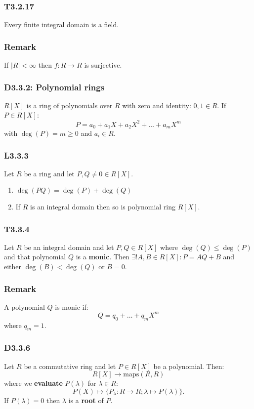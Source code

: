\documentclass{article}
\begin{document}
\begin{multicols*}{3}
\subsubsection*{T3.2.17}
Every finite integral domain is a field.

\subsubsection*{Remark}
If $|R|<\infty$ then $f:R\rightarrow R$ is surjective.

\subsubsection*{D3.3.2: Polynomial rings}
$R[X]$ is a ring of polynomials over $R$ 
with zero and identity: $0,1\in R$. If $P\in R[X]$:
$$P=a_0+a_1 X+a_2 X^2+\dots+a_m X^m$$
with $\deg(P)=m\geq0$ and $a_i\in R$.

\subsubsection*{L3.3.3}
Let $R$ be a ring and let $P,Q\neq0\in R[X]$.
\begin{enumerate}
    \item $\deg(PQ)=\deg(P)+\deg(Q)$
    \item If $R$ is an integral domain then
    so is polynomial ring $R[X]$.
\end{enumerate}

\subsubsection*{T3.3.4}
Let $R$ be an integral domain and
let $P,Q\in R[X]$ where $\deg(Q)\leq\deg(P)$
and that polynomial $Q$ is a \textbf{monic}.
Then $\exists!A,B\in R[X]:P=AQ+B$ and either
$\deg(B)<\deg(Q)$ or $B=0$.

\subsubsection*{Remark}
A polynomial $Q$ is monic if:
$$Q=q_0+\dots+q_m X^m$$
where $q_m=1$.

\subsubsection*{D3.3.6}
Let $R$ be a commutative ring and let $P\in R[X]$
be a polynomial. Then:
$$R[X]\rightarrow\text{maps}(R,R)$$
where we \textbf{evaluate} $P(\lambda)$ for $\lambda\in R$:
$$P(X)\mapsto\{P_{\lambda}:R\rightarrow R;
\lambda\mapsto P(\lambda)\}.$$
If $P(\lambda)=0$ then $\lambda$ is a 
\textbf{root} of $P$.


\end{multicols*}
\end{document}
